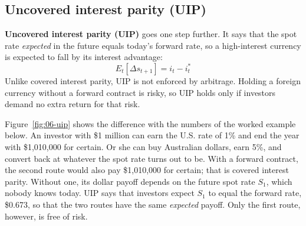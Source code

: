 \subsection{Uncovered interest parity (UIP)}

\textbf{Uncovered interest parity (UIP)} goes one step further. It says that the spot rate \emph{expected} in the future equals today's forward rate, so a high-interest currency is expected to fall by its interest advantage:
\begin{equation}
  E_t[\Delta s_{t+1}] = i_t - i^*_t
  \label{eq:06-uip}
\end{equation}
Unlike covered interest parity, UIP is not enforced by arbitrage. Holding a foreign currency without a forward contract is risky, so UIP holds only if investors demand no extra return for that risk.

Figure~\ref{fig:06-uip} shows the difference with the numbers of the worked example below. An investor with \$1 million can earn the U.S. rate of 1\% and end the year with \$1,010,000 for certain. Or she can buy Australian dollars, earn 5\%, and convert back at whatever the spot rate turns out to be. With a forward contract, the second route would also pay \$1,010,000 for certain; that is covered interest parity. Without one, its dollar payoff depends on the future spot rate $S_1$, which nobody knows today. UIP says that investors expect $S_1$ to equal the forward rate, \$0.673, so that the two routes have the same \emph{expected} payoff. Only the first route, however, is free of risk.

